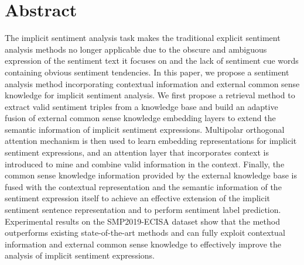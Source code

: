 \section{Abstract}

The implicit sentiment analysis task makes the traditional explicit sentiment analysis methods no longer applicable due to the obscure and ambiguous expression of the sentiment text it focuses on and the lack of sentiment cue words containing obvious sentiment tendencies.
In this paper, we propose a sentiment analysis method incorporating contextual information and external common sense knowledge for implicit sentiment analysis.
We first propose a retrieval method to extract valid sentiment triples from a knowledge base and build an adaptive fusion of external common sense knowledge embedding layers to extend the semantic information of implicit sentiment expressions.
Multipolar orthogonal attention mechanism is then used to learn embedding representations for implicit sentiment expressions, and an attention layer that incorporates context is introduced to mine and combine valid information in the context.
Finally, the common sense knowledge information provided by the external knowledge base is fused with the contextual representation and the semantic information of the sentiment expression itself to achieve an effective extension of the implicit sentiment sentence representation and to perform sentiment label prediction.
Experimental results on the SMP2019-ECISA dataset show that the method outperforms existing state-of-the-art methods and can fully exploit contextual information and external common sense knowledge to effectively improve the analysis of implicit sentiment expressions.
